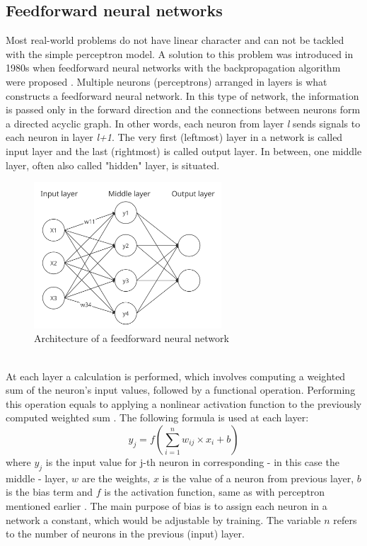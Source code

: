 \subsection*{Feedforward neural networks}
Most real-world problems do not have linear character and can not be tackled with the simple perceptron model. A solution to this problem was introduced in 1980s when feedforward neural networks with the backpropagation algorithm were proposed \cite{navrat2007umela}. Multiple neurons (perceptrons) arranged in layers is what constructs a feedforward neural network. In this type of network, the information is passed only in the forward direction and the connections between neurons form a directed acyclic graph. In other words, each neuron from layer \textit{l} sends signals to each neuron in layer \textit{l+1}. The very first (leftmost) layer in a network is called input layer and the last (rightmost) is called output layer. In between, one middle layer, often also called "hidden" layer, is situated. 
\begin{figure}[!ht]
\centering
\includegraphics[width=7cm]{assets/images/FFN}
\caption{Architecture of a feedforward neural network
\label{fig:FFN}}
\end{figure}
\\At each layer a calculation is performed, which involves computing a weighted sum of the neuron's input values, followed by a functional operation. Performing this operation equals to applying a nonlinear activation function to the previously computed weighted sum \cite{tutorialIEEE}. The following formula is used at each layer:
\begin{equation}
    y_{j}=f\left({\sum \limits _{i=1}^{n} w_{ij} \times x_{i} + b}\right)
\end{equation}
where $y_j$ is the input value for j-th neuron in corresponding - in this case the middle - layer, $w$ are the weights, $x$ is the value of a neuron from previous layer, $b$ is the bias term and $f$ is the activation function, same as with perceptron mentioned earlier \cite{tutorialIEEE}. The main purpose of bias is to assign each neuron in a network a constant, which would be adjustable by training. The variable $n$ refers to the number of neurons in the previous (input) layer.
